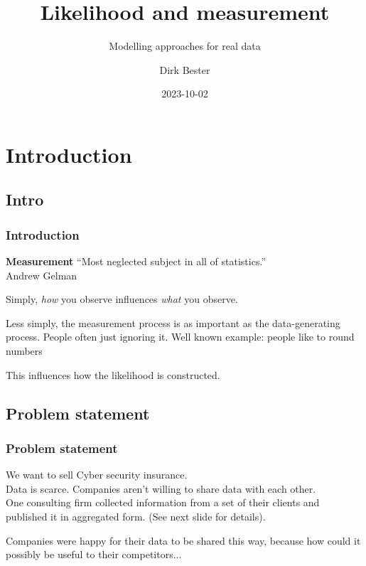 \documentclass[usenames,dvipsnames]{beamer}
\title[Likelihood and measurement]{Likelihood and measurement}
\subtitle{Modelling approaches for real data}
\author{Dirk Bester}
\date{2023-10-02}
\begin{document}
\begin{frame}
\maketitle
\end{frame}

\section{Introduction}

\subsection{Intro}

\begin{frame}[t]
  \tableofcontents[currentsubsection]
\end{frame}

\begin{frame}[t]
\frametitle{Introduction}
\begin{center}

\end{center}
\begin{block}{\textbf{Measurement}}
``Most neglected subject in all of statistics.''
\\
\hfill {\small Andrew Gelman}
\end{block}

\pause
Simply, \textit{how} you observe influences \textit{what} you observe.

\pause
Less simply, the measurement process is as important as the data-generating process.
People often just ignoring it.
\pause
Well known example: people like to round numbers

\pause
This influences how the likelihood is constructed.

\end{frame}


\subsection{Problem statement}

\begin{frame}[t]
  \tableofcontents[currentsubsection]
\end{frame}

\begin{frame}[t]
\frametitle{Problem statement}

We want to sell Cyber security insurance.
\pause \\
Data is scarce.
Companies aren't willing to share data with each other.
\pause \\
One consulting firm collected information from a set of their clients and published it in aggregated form.
(See next slide for details).

\pause \vfill

Companies were happy for their data to be shared this way, because how could it possibly be useful to their competitors...

\end{frame}
\end{document}
